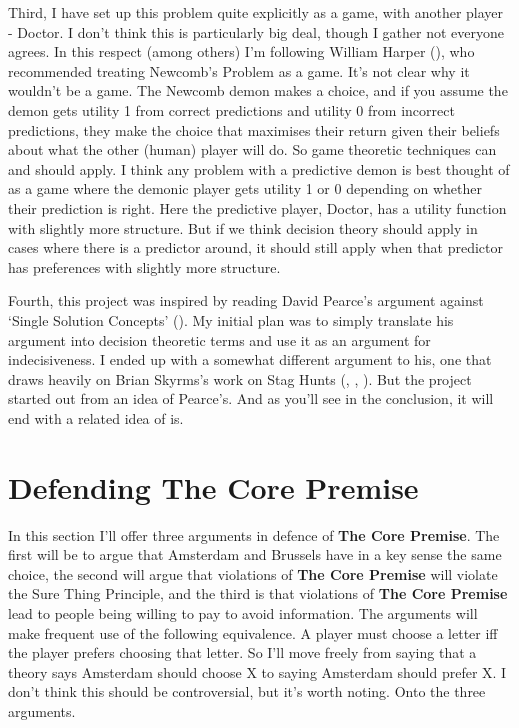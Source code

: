 \documentclass[
  10pt,
  letterpaper,
  DIV=11,
  numbers=noendperiod,
  twoside]{scrartcl}
\begin{document}
Third, I have set up this problem quite explicitly as a game, with
another player - Doctor. I don't think this is particularly big deal,
though I gather not everyone agrees. In this respect (among others) I'm
following William Harper (), who
recommended treating Newcomb's Problem as a game. It's not clear why it
wouldn't be a game. The Newcomb demon makes a choice, and if you assume
the demon gets utility 1 from correct predictions and utility 0 from
incorrect predictions, they make the choice that maximises their return
given their beliefs about what the other (human) player will do. So game
theoretic techniques can and should apply. I think any problem with a
predictive demon is best thought of as a game where the demonic player
gets utility 1 or 0 depending on whether their prediction is right. Here
the predictive player, Doctor, has a utility function with slightly more
structure. But if we think decision theory should apply in cases where
there is a predictor around, it should still apply when that predictor
has preferences with slightly more structure.

Fourth, this project was inspired by reading David Pearce's argument
against `Single Solution Concepts' (). My initial plan was to simply translate his argument into
decision theoretic terms and use it as an argument for indecisiveness. I
ended up with a somewhat different argument to his, one that draws
heavily on Brian Skyrms's work on Stag Hunts
(, ,
). But the project started out from an
idea of Pearce's. And as you'll see in the conclusion, it will end with
a related idea of is.

\section{Defending The Core Premise}\label{defending-the-core-premise}

In this section I'll offer three arguments in defence of \textbf{The
Core Premise}. The first will be to argue that Amsterdam and Brussels
have in a key sense the same choice, the second will argue that
violations of \textbf{The Core Premise} will violate the Sure Thing
Principle, and the third is that violations of \textbf{The Core Premise}
lead to people being willing to pay to avoid information. The arguments
will make frequent use of the following equivalence. A player must
choose a letter iff the player prefers choosing that letter. So I'll
move freely from saying that a theory says Amsterdam should choose X to
saying Amsterdam should prefer X. I don't think this should be
controversial, but it's worth noting. Onto the three arguments.
\end{document}
